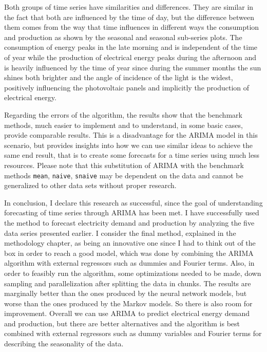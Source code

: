 \documentclass[12pt,a4paper,titlepage]{report}
\begin{document}
Both groups of time series have similarities and differences. They are similar in the fact that both are influenced by the time of day, but the difference between them comes from the way that time influences in different ways the consumption and production as shown by the seasonal and seasonal sub-series plots. The consumption of energy peaks in the late morning and is independent of the time of year while the production of electrical energy peaks during the afternoon and is heavily influenced by the time of year since during the summer months the sun shines both brighter and the angle of incidence of the light is the widest, positively influencing the photovoltaic panels and implicitly the production of electrical energy.

Regarding the errors of the algorithm, the results show that the benchmark methods, much easier to implement and to understand, in some basic cases, provide comparable results. This is a disadvantage for the ARIMA model in this scenario, but provides insights into how we can use similar ideas to achieve the same end result, that is to create some forecasts for a time series using much less resources. Please note that this substitution of ARIMA with the benchmark methods \texttt{mean}, \texttt{naive}, \texttt{snaive} may be dependent on the data and cannot be generalized to other data sets without proper research.

In conclusion, I declare this research as successful, since the goal of understanding forecasting of time series through ARIMA has been met.
I have successfully used the method to forecast electricity demand and production by analyzing the five data series presented earlier.
I consider the final method, explained in the methodology chapter, as being an innovative one since I had to think out of the box in order to reach a good model, which was done by combining the ARIMA algorithm with external regressors such as dummies and Fourier terms. Also, in order to feasibly run the algorithm, some optimizations needed to be made, down sampling and parallelization after splitting the data in chunks.
The results are marginally better than the ones produced by the neural network models, but worse than the ones produced by the Markov models. So there is also room for improvement.
Overall we can use ARIMA to predict electrical energy demand and production, but there are better alternatives and the algorithm is best combined with external regressors such as dummy variables and Fourier terms for describing the seasonality of the data.
\end{document}
